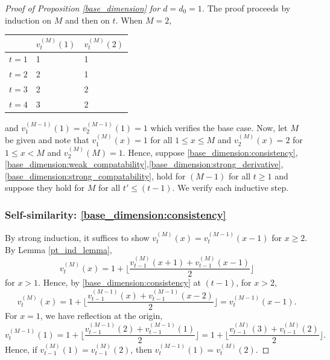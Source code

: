 \documentclass[12pt]{amsart}
\begin{document}
	\begin{proof}[Proof of Proposition \ref{base_dimension} for $d=d_0 = 1$]
		The proof proceeds by induction on $M$ and then on $t$. When $M=2$, 
		\begin{center}
			\begin{tabular}{l|l|l}
				& $v_t^{(M)}(1)$ & $v_t^{(M)}(2)$ \\ \hline
				$t=1$ & 1 & 1  \\ 
				$t=2$ & 2 & 1  \\ 
				$t=3$ & 2 & 2 \\
				$t=4$ & 3 & 2 
			\end{tabular}
		\end{center}
		and $v_1^{(M-1)}(1) = v_2^{(M-1)}(1) = 1$ which verifies the base case. Now, let $M$ be given and note that
		$v_1^{(M)}(x) = 1$ for all $1 \leq x \leq M$ and $v_2^{(M)}(x) = 2$ for $1 \leq x < M$
		and $v_2^{(M)}(M) = 1$. Hence, suppose \eqref{base_dimension:consistency},\eqref{base_dimension:weak_compatability},\eqref{base_dimension:strong_derivative},\eqref{base_dimension:strong_compatability}, hold for $(M-1)$ for all $t \geq 1$ 
		and suppose they hold for $M$ for all $t' \leq (t-1)$. 
		We verify each inductive step. 
		
		\subsubsection*{Self-similarity: \eqref{base_dimension:consistency}}
		By strong induction, it suffices to show $v_t^{(M)}(x) = v_t^{(M-1)}(x-1)$ for $x \geq 2$.
		By Lemma \ref{pt_ind_lemma}, 
		\[
		v_{t}^{(M)}(x) = 1 + \lfloor \frac{v_{t-1}^{(M)}(x+1) + v_{t-1}^{(M)}(x-1)}{2} \rfloor
		\]
		for $x > 1$. 
		Hence, by \eqref{base_dimension:consistency} at $(t-1)$, for $x > 2$, 
		\[
		v_{t}^{(M)}(x) = 1 + \lfloor \frac{v_{t-1}^{(M-1)}(x) + v_{t-1}^{(M-1)}(x-2)}{2} \rfloor = v_t^{(M-1)}(x-1).
		\]
		For $x=1$, we have reflection at the origin, 
		\[
		v_{t}^{(M-1)}(1) = 1 + \lfloor \frac{v_{t-1}^{(M-1)}(2) + v_{t-1}^{(M-1)}(1)}{2} \rfloor = 1 + \lfloor \frac{v_{t-1}^{(M)}(3) + v_{t-1}^{(M)}(2)}{2} \rfloor.
		\]
		Hence, if $v_{t-1}^{(M)}(1) = v_{t-1}^{(M)}(2)$, then $v_{t}^{(M-1)}(1) = v_{t}^{(M)}(2)$. 
		

\end{proof}
\end{document}
